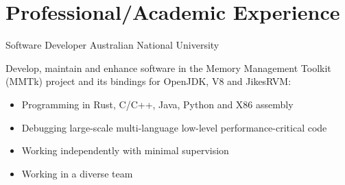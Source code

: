 \section{Professional/Academic Experience}

{Software Developer}
{Australian National University}
{}
{}
{Develop, maintain and enhance software in the Memory Management Toolkit (MMTk) project and its bindings for OpenJDK, V8 and JikesRVM:
    \begin{itemize}
    \item Programming in Rust, C/C++, Java, Python and X86 assembly
    \item Debugging large-scale multi-language low-level performance-critical code
    \item Working independently with minimal supervision
    \item Working in a diverse team
\end{itemize}}
{}

